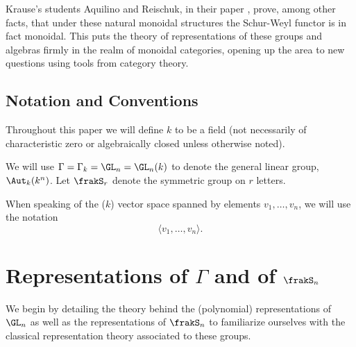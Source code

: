 \documentclass[12pt]{article}
\begin{document}
Krause's students Aquilino and Reischuk, in their paper \cite{aquilino-reischuk}, prove, among other facts, that 
under these natural monoidal structures the Schur-Weyl functor is in fact monoidal. This puts the theory of representations 
of these groups and algebras firmly in the realm of monoidal categories, opening up the area to new questions using 
tools from category theory.

\subsection{Notation and Conventions}\label{subsec:notation}
Throughout this paper we will define $k$ to be a field (not necessarily of characteristic zero or algebraically closed unless otherwise noted).

We will use $\Gamma=\Gamma_k=\GL_n=\GL_n(k)$ to denote the general linear group, $\Aut_k(k^n)$. Let $\frakS_r$ denote the symmetric group on $r$ letters.

When speaking of the ($k$) vector space spanned by elements $v_1,\dots,v_n$, we will use the notation 
\[\langle v_1,\dots, v_n\rangle.\]


\newpage
\section{Representations of \texorpdfstring{$\Gamma$}{Gamma} and of \texorpdfstring{$\frakS_n$}{Sn}}
We begin by detailing the theory behind the (polynomial) representations of $\GL_n$ as well as the representations of $\frakS_n$ to 
familiarize ourselves with the classical representation theory associated to these groups.
\end{document}
